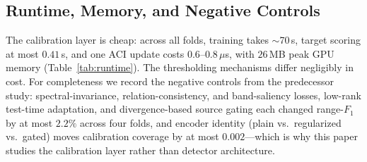 \subsection{Runtime, Memory, and Negative Controls}
\label{sec:neg-controls}
The calibration layer is cheap: across all folds, training takes $\sim$70\,s, target scoring at most $0.41$\,s, and one ACI update costs $0.6$--$0.8\,\mu$s, with $26$\,MB peak GPU memory (Table~\ref{tab:runtime}). The thresholding mechanisms differ negligibly in cost. For completeness we record the negative controls from the predecessor study: spectral-invariance, relation-consistency, and band-saliency losses, low-rank test-time adaptation, and divergence-based source gating each changed range-$F_1$ by at most $2.2\%$ across four folds, and encoder identity (plain vs.\ regularized vs.\ gated) moves calibration coverage by at most $0.002$---which is why this paper studies the calibration layer rather than detector architecture.

\begin{table}[t]
\caption{Per-run cost (one fold, one seed; RTX 3060 Ti). ACI update latency measured over all evaluation windows and nominal levels.}
\label{tab:runtime}
\centering
\small
{}
\end{table}
